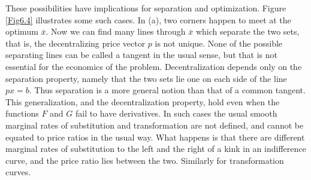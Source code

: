 These possibilities have implications for separation and optimization. Figure \ref{Fig6.4} illustrates some such cases. In (a), two corners happen to meet at the optimum $\bar{x}$. Now we can find many lines through $\bar{x}$ which separate the two sets, that is, the decentralizing price vector $p$ is not unique. None of the possible separating lines can be called a tangent in the usual sense, but that is not essential for the economics of the problem. Decentralization depends only on the separation property, namely that the two sets lie one on each side of the line $px=b$. Thus separation is a more general notion than that of a common tangent. This generalization, and the decentralization property, hold even when the functions $F$ and $G$ fail to have derivatives. In such cases the usual smooth marginal rates of substitution and transformation are not defined, and cannot be equated to price ratios in the usual way. What happens is that there are different marginal rates of substitution to the left and the right of a kink in an indifference curve, and the price ratio lies between the two. Similarly for transformation curves.

